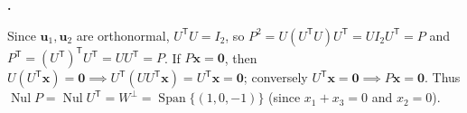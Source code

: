 \documentclass[10pt]{scrartcl}
\newcommand{\vv}[1]{\mathbf{#1}}
\DeclareMathOperator{\spn}{Span}\DeclareMathOperator{\Nul}{Nul}\DeclareMathOperator{\Col}{Col}\DeclareMathOperator{\Row}{Row}\DeclareMathOperator{\tr}{tr}\DeclareMathOperator{\proj}{proj}
\begin{document}
\begin{prob}\textbf{.}\par{}
\begin{steps}
  \ii Since $\vv u_1,\vv u_2$ are orthonormal, $U^{\mathsf T}U=I_2$, so $P^2=U(U^{\mathsf T}U)U^{\mathsf T}=UI_2U^{\mathsf T}=P$ and $P^{\mathsf T}=(U^{\mathsf T})^{\mathsf T}U^{\mathsf T}=UU^{\mathsf T}=P$.
  \ii If $P\vv x=\vv 0$, then $U(U^{\mathsf T}\vv x)=\vv 0 \implies U^{\mathsf T}(UU^{\mathsf T}\vv x)=U^{\mathsf T}\vv x=\vv 0$; conversely $U^{\mathsf T}\vv x=\vv 0 \implies P\vv x=\vv 0$. Thus $\Nul P=\Nul U^{\mathsf T}=W^\perp=\spn\{(1,0,-1)\}$ (since $x_1+x_3=0$ and $x_2=0$).
\end{steps}
\end{prob}
\end{document}
